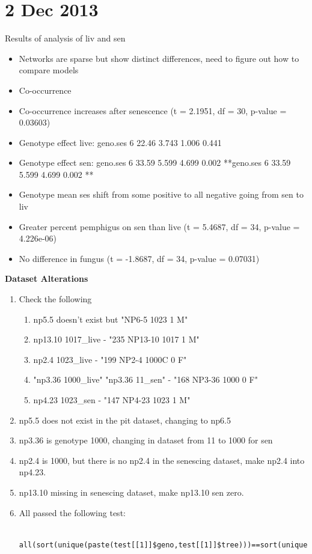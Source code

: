 \documentclass[12pt]{article}
\begin{document}
\section{2 Dec 2013}

Results of analysis of liv and sen
\begin{itemize}
\item Networks are sparse but show distinct differences, need to
  figure out how to compare models
\item Co-occurrence

\item Co-occurrence increases after senescence (t = 2.1951, df = 30, p-value = 0.03603)
\item Genotype effect live: geno.ses     6  22.46   3.743   1.006  0.441
\item Genotype effect sen: geno.ses     6  33.59   5.599   4.699
  0.002 **geno.ses     6  33.59   5.599   4.699  0.002 **
\item Genotype mean ses shift from some positive to all negative going
  from sen to liv

\item Greater percent pemphigus on sen than live (t = 5.4687, df = 34, p-value = 4.226e-06)
\item No difference in fungus (t = -1.8687, df = 34, p-value = 0.07031)
\end{itemize}

\textbf{Dataset Alterations}
\begin{enumerate}
\item Check the following
  \begin{enumerate}
  \item np5.5 doesn't exist but "NP6-5  1023       1   M"
  \item np13.10 1017_live - "235 NP13-10  1017       1   M"
  \item np2.4 1023_live - "199 NP2-4 1000C       0   F"
  \item "np3.36 1000_live"  "np3.36 11_sen" - "168 NP3-36  1000       0   F"
  \item np4.23 1023_sen - "147 NP4-23  1023       1   M"
  \end{enumerate}
\item np5.5 does not exist in the pit dataset, changing to np6.5
\item np3.36 is genotype 1000, changing in dataset from 11 to 1000 for sen
\item np2.4 is 1000, but there is no np2.4 in the senescing dataset,
  make np2.4 into np4.23.
\item np13.10 missing in senescing dataset, make np13.10 sen zero.
\item All passed the following test:
\begin{verbatim}
    all(sort(unique(paste(test[[1]]$geno,test[[1]]$tree)))==sort(unique(paste(test[[2]]$geno,test[[2]]$tree))))
\end{verbatim}
\end{enumerate}
\end{document}
